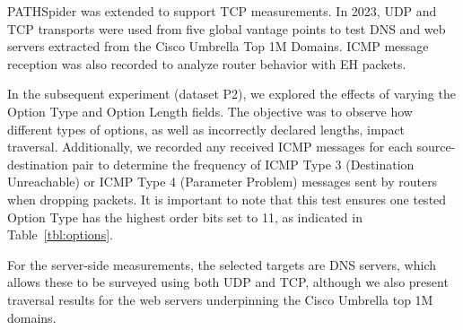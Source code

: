 \documentclass[conference]{IEEEtran}
\begin{document}
PATHSpider was extended to support TCP measurements. In 2023, UDP and TCP
transports were used from five global vantage points to test DNS and web
servers extracted from the Cisco Umbrella Top 1M Domains. ICMP message
reception was also recorded to analyze router behavior with EH packets.



In the subsequent experiment (dataset P2), we explored the effects of varying
the Option Type and Option Length fields. The objective was to observe how
different types of options, as well as incorrectly declared lengths, impact
traversal. Additionally, we recorded any received ICMP messages for each
source-destination pair to determine the frequency of ICMP Type 3 (Destination
Unreachable) or ICMP Type 4 (Parameter Problem) messages sent by routers when
dropping packets. It is important to note that this test ensures one tested
Option Type has the highest order bits set to 11, as indicated in
Table~\ref{tbl:options}.


For the server-side measurements, the selected targets are DNS servers, which
allows these to be surveyed using both UDP and TCP, although we also present
traversal results for the web servers underpinning the Cisco Umbrella top 1M
domains.

\end{document}
